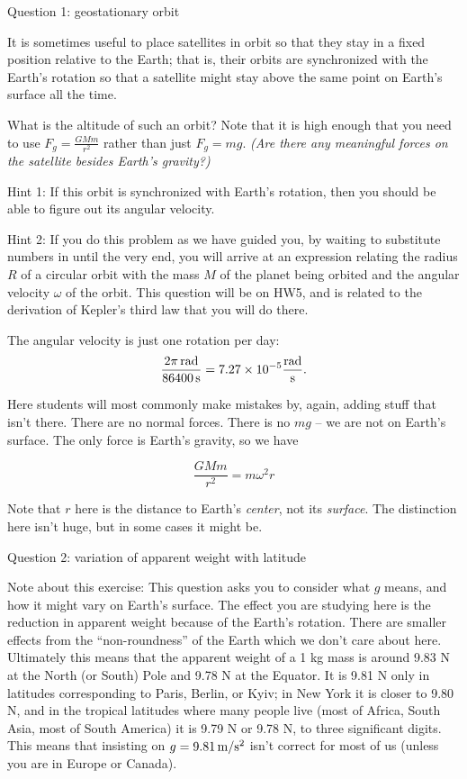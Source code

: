 \documentclass[12pt]{article}
\begin{document}
\Large
\centerline{}
\normalsize
\centerline{}

\medskip


\centerline{\Large Question 1: geostationary orbit}

It is sometimes useful to place satellites in orbit so that they stay in a fixed position relative to the
Earth; that is, their orbits are synchronized with the Earth's rotation so that a satellite might stay
above the same point on Earth’s surface all the time.

What is the altitude of such an orbit? Note that it is high enough that you need to use $F_g=\frac{GMm}{r^2}$
rather than just $F_g = mg$. {\it (Are there any meaningful forces on the satellite besides Earth's gravity?)}

{\sc Hint 1:} If this orbit is synchronized with Earth's rotation, then you should be able to figure out its
angular velocity.




{\sc Hint 2:} If you do this problem as we have guided you, by waiting to substitute numbers in until the 
very end, you will arrive at an expression relating the radius $R$ of a circular orbit with the mass $M$ of the 
planet being orbited and the angular velocity $\omega$ of the orbit. This question will be on HW5, and is related
to the derivation of Kepler's third law that you will do there.

{\color{Red}
	The angular velocity is just one rotation per day: $$\frac {2\pi\,\text{rad}}{86400\,\rm s} = 7.27 \times 10^{-5} \frac{\text{rad}}{\rm s}.$$

Here students will most commonly make mistakes by, again, adding stuff that isn't there. There are no normal forces. There is no $mg$ -- we are not on Earth's surface. The only force is Earth's gravity, so we have 

$$
\frac{GMm}{r^2} = m \omega^2 r
$$

Note that $r$ here is the distance to Earth's {\it center}, not its {\it surface}. The distinction here isn't huge, but in some cases it might be.
	
}


\newpage

\centerline{\Large Question 2: variation of apparent weight with latitude}

\medskip

{\footnotesize Note about this exercise: This question asks you to consider what $g$ means, and how it might vary on Earth's surface. The effect you are studying here is the reduction in apparent weight because of the Earth's rotation. There are smaller effects from the ``non-roundness'' of the Earth which we don't care about here. Ultimately this means that the apparent weight of a 1 kg mass is around 9.83 N at the North (or South) Pole and 9.78 N at the Equator. It is 9.81 N only in latitudes corresponding to Paris, Berlin, or Kyiv; in New York it is closer to 9.80 N, and in the tropical latitudes where many people live (most of Africa, South Asia, most of South America) it is 9.79 N or 9.78 N, to three significant digits. This means that insisting on $g=9.81\,\rm m/\rm s^2$ isn't correct for most of us (unless you are in Europe or Canada).
}
\end{document}
